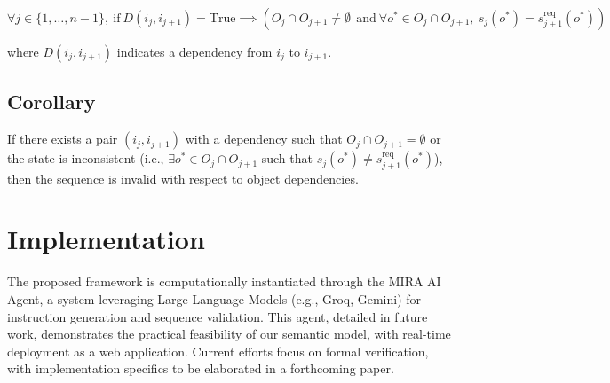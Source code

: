 \documentclass[a4paper,11pt]{lmcs}
\begin{document}
\[
\forall j \in \{1, \ldots, n-1\},\
\text{if}\ D(i_j, i_{j+1}) = \text{True}
\implies
\left( O_j \cap O_{j+1} \neq \emptyset\
\ \text{and}\
\forall o^* \in O_j \cap O_{j+1},\ s_j(o^*) = s_{j+1}^{\mathrm{req}}(o^*) \right)
\]

where $D(i_j, i_{j+1})$ indicates a dependency from $i_j$ to $i_{j+1}$.

\subsection*{Corollary}

If there exists a pair $(i_j, i_{j+1})$ with a dependency such that $O_j \cap O_{j+1} = \emptyset$
or the state is inconsistent (i.e., $\exists o^* \in O_j \cap O_{j+1}$ such that $s_j(o^*) \neq s_{j+1}^{\mathrm{req}}(o^*)$),
then the sequence is invalid with respect to object dependencies.

\section{Implementation}
The proposed framework is computationally instantiated through the MIRA AI Agent, a system leveraging Large Language Models (e.g., Groq, Gemini) for instruction generation and sequence validation. This agent, detailed in future work, demonstrates the practical feasibility of our semantic model, with real-time deployment as a web application. Current efforts focus on formal verification, with implementation specifics to be elaborated in a forthcoming paper.
\end{document}

